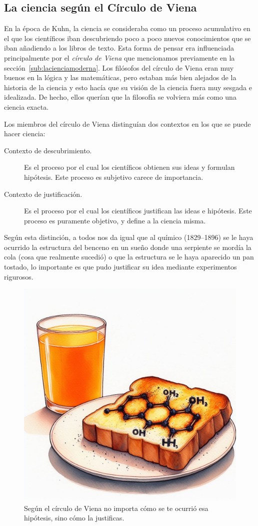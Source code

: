\subsection*{La ciencia según el Círculo de Viena}
\label{sub:circulodeviena}
En la época de Kuhn, la ciencia se consideraba como un proceso acumulativo en el
que los científicos iban descubriendo poco a poco nuevos conocimientos que se
iban añadiendo a los libros de texto.
Esta forma de pensar era influenciada principalmente por el \emph{círculo de
    Viena} que mencionamos previamente en la sección~\ref{sub:lacienciamoderna}.
Los filósofos del círculo de Viena eran muy buenos en la lógica y las
matemáticas, pero estaban más bien alejados de la historia de la ciencia y esto
hacía que su visión de la ciencia fuera muy sesgada e idealizada.
De hecho, ellos querían que la filosofía se volviera más como una ciencia
exacta.

Los miembros del círculo de Viena distinguían dos contextos en los que se
puede hacer ciencia:
\begin{description}
    \item[Contexto de descubrimiento.] Es el proceso por el cual los científicos
        obtienen sus ideas y formulan hipótesis.
        Este proceso es subjetivo carece de importancia.
    \item[Contexto de justificación.] Es el proceso por el cual los científicos
        justifican las ideas e hipótesis.
        Este proceso es puramente objetivo, y define a la ciencia misma.
\end{description}
Según esta distinción, a todos nos da igual que al químico  (1829--1896) se le haya ocurrido la
estructura del benceno en un sueño donde una serpiente se mordía la cola (cosa
que realmente sucedió) o que la estructura se le haya aparecido un pan tostado,
lo importante es que pudo justificar su idea mediante experimentos rigurosos.

\begin{figure}[ht]
    \centering
    \includegraphics[width=0.8\linewidth]{img/formaciondehipotesis}
    \caption{Según el círculo de Viena no importa cómo se te ocurrió esa
        hipótesis, sino cómo la justificas.}
\end{figure}


